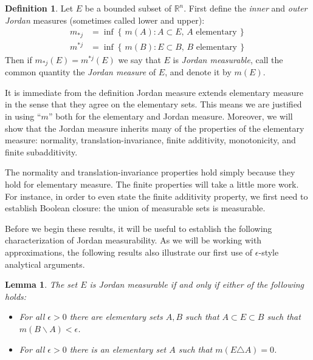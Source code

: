 \documentclass[11pt,oneside]{amsbook}
\newcommand{\set}[1]{\left\{\,#1\,\right\}}
\renewcommand{\setminus}{\smallsetminus}
\newcommand{\RR}{\mathbb R}
\theoremstyle{definition}
\theoremstyle{plain}
\newtheorem{lem}[thm]{Lemma}
\theoremstyle{definition}
\newtheorem{defn}[thm]{Definition}
\theoremstyle{remark}
\numberwithin{equation}{section}
\numberwithin{figure}{section}
\begin{document}
\begin{defn}
  Let $E$ be a bounded subset of $\RR^n$. First define the \emph{inner} and \emph{outer Jordan} measures (sometimes called lower and upper):
  \begin{align*}
    m_{*j}&=\inf\set{m(A):A\subset E,\, A\text{ elementary}}\\
    m^{*j}&=\inf\set{m(B):E\subset B,\, B\text{ elementary}}
  \end{align*}
  Then if $m_{*j}(E)=m^{*j}(E)$ we say that $E$ is \emph{Jordan measurable}, call the common quantity the \emph{Jordan measure} of $E$, and denote it by $m(E)$.
\end{defn}

It is immediate from the definition Jordan measure extends elementary measure in the sense that they agree on the elementary sets. This means we are justified in using ``$m$'' both for the elementary and Jordan measure. Moreover, we will show that the Jordan measure inherits many of the properties of the elementary measure: normality, translation-invariance, finite additivity, monotonicity, and finite subadditivity.

The normality and translation-invariance properties hold simply because they hold for elementary measure. The finite properties will take a little more work. For instance, in order to even state the finite additivity property, we first need to establish Boolean closure: the union of measurable sets is measurable.

Before we begin these results, it will be useful to establish the following characterization of Jordan measurability. As we will be working with approximations, the following results also illustrate our first use of $\epsilon$-style analytical arguments.

\begin{lem}
  \label{lem:jordan-equiv}
  The set $E$ is Jordan measurable if and only if either of the following holds:
  \begin{itemize}
  \item For all $\epsilon>0$ there are elementary sets $A,B$ such that $A\subset E\subset B$ such that $m(B\setminus A)<\epsilon$.
  \item For all $\epsilon>0$ there is an elementary set $A$ such that $m(E\triangle A)=0$.
  \end{itemize}
\end{lem}
\end{document}
